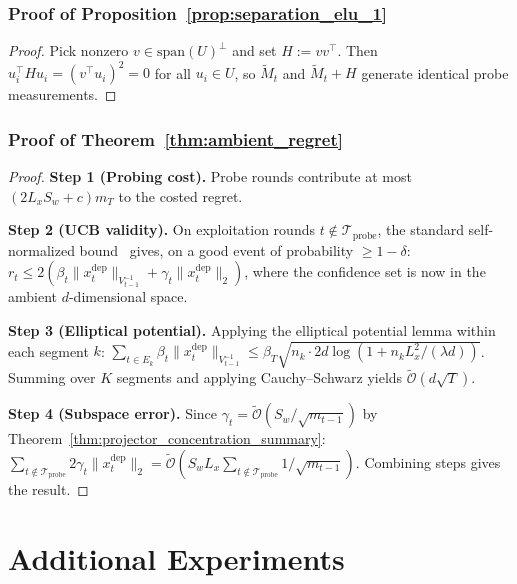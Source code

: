 \documentclass{article}
\newcommand{\cTprobe}{\mathcal{T}_{\mathrm{probe}}}
\newcommand{\tilO}{\widetilde{\mathcal{O}}}
\newcommand{\Span}{\mathrm{span}}
\begin{document}
\subsubsection{Proof of Proposition~\ref{prop:separation_elu_1}}
\label{proof:separation_elu_1}

\begin{proof}
Pick nonzero $v \in \Span(U)^\perp$ and set $H := vv^\top$.
Then $u_i^\top H u_i = (v^\top u_i)^2 = 0$ for all $u_i \in U$, so $\widetilde M_t$ and $\widetilde M_t + H$ generate identical probe measurements.
\end{proof}

\subsubsection{Proof of Theorem~\ref{thm:ambient_regret}}
\label{proof:ambient_regret}

\begin{proof}
\textbf{Step 1 (Probing cost).}
Probe rounds contribute at most $(2L_xS_w+c)m_T$ to the costed regret.

\textbf{Step 2 (UCB validity).}
On exploitation rounds $t \notin \cTprobe$, the standard self-normalized bound~\citep{abbasi2011improved} gives, on a good event of probability $\ge 1-\delta$:
$r_t \le 2(\beta_t \|x_t^{\mathrm{dep}}\|_{V_{t-1}^{-1}} + \gamma_t \|x_t^{\mathrm{dep}}\|_2)$,
where the confidence set is now in the ambient $d$-dimensional space.

\textbf{Step 3 (Elliptical potential).}
Applying the elliptical potential lemma within each segment $k$:
$\sum_{t \in E_k} \beta_t \|x_t^{\mathrm{dep}}\|_{V_{t-1}^{-1}} \le \beta_T \sqrt{n_k \cdot 2d\log(1+n_kL_x^2/(\lambda d))}$.
Summing over $K$ segments and applying Cauchy--Schwarz yields $\tilO(d\sqrt{T})$.

\textbf{Step 4 (Subspace error).}
Since $\gamma_t = \tilO(S_w/\sqrt{m_{t-1}})$ by Theorem~\ref{thm:projector_concentration_summary}:
$\sum_{t \notin \cTprobe} 2\gamma_t \|x_t^{\mathrm{dep}}\|_2 = \tilO(S_wL_x\sum_{t \notin \cTprobe} 1/\sqrt{m_{t-1}})$.
Combining steps gives the result.
\end{proof}

\section{Additional Experiments}
\label{app:additional_experiments}
\end{document}
